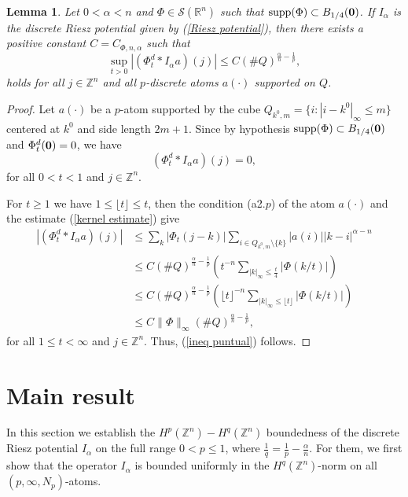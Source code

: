 \documentclass[leqno,12pt]{article} %
\newcommand\supp{\mathop{\rm supp}}
\theoremstyle{plain} %
\newtheorem{lemma}[theorem]{\indent\sc Lemma}
\theoremstyle{definition} %
\begin{document}
\begin{lemma} \label{phimax}
Let $0 < \alpha < n$ and $\Phi \in \mathcal{S}(\mathbb{R}^n)$ such that $\supp(\Phi) \subset B_{1/4}({\bf 0})$. If $I_{\alpha}$ is the discrete Riesz potential given by (\ref{Riesz potential}), then there exists a positive constant $C = C_{\Phi, n, \alpha}$ such that
\begin{equation} \label{ineq puntual}
\sup_{t>0} |(\Phi_t^d \ast I_{\alpha}a)(j)| \leq C (\# Q)^{\frac{\alpha}{n} - \frac{1}{p}},
\end{equation}
holds for all $j \in \mathbb{Z}^n$ and all $p$-discrete atoms $a(\cdot)$ supported on $Q$.
\end{lemma}

\begin{proof}
Let $a(\cdot)$ be a $p$-atom supported by the cube $Q_{k^0, m} = \{ i : | i - k^0 |_{\infty} \leq m \}$ centered at $k^0$ and 
side length $2m+1$. Since by hypothesis $\supp(\Phi) \subset B_{1/4}({\bf 0})$ and $\Phi^{d}_{t}({\bf 0}) = 0$, we have
\[
(\Phi_t^d \ast I_{\alpha}a)(j) = 0, 
\]
for all $0 < t < 1$ and $j \in \mathbb{Z}^n$.

For $t \geq 1$ we have $1 \leq \lfloor t \rfloor \leq t$, then the condition (a2.$p$) of the atom $a(\cdot)$ and the estimate 
(\ref{kernel estimate}) give
\begin{align*}
|(\Phi_t^d \ast I_{\alpha}a)(j)| &\leq \sum_{k} |\Phi_{t}(j-k)| \sum_{i \in Q_{k^0, m} \setminus \{ k \}} |a(i)| |k-i|^{\alpha - n} \\
&\leq C (\# Q)^{\frac{\alpha}{n} - \frac{1}{p}} \left( t^{-n} \sum_{|k|_{\infty} \leq \frac{t}{4}} |\Phi(k/t)| \right) \\
&\leq C (\# Q)^{\frac{\alpha}{n} - \frac{1}{p}} \left( \lfloor t \rfloor^{-n} \sum_{|k|_{\infty} \leq \lfloor t \rfloor} 
|\Phi(k/t)| \right) \\
&\leq C \|\Phi \|_{\infty} (\# Q)^{\frac{\alpha}{n} - \frac{1}{p}},
\end{align*}
for all $1 \leq t < \infty$ and $j \in \mathbb{Z}^n$. Thus, (\ref{ineq puntual}) follows.
\end{proof}

\section{Main result}

In this section we establish the $H^p(\mathbb{Z}^n) - H^q(\mathbb{Z}^n)$ boundedness of the discrete Riesz potential $I_{\alpha}$ on the full range $0 < p \leq 1$, where $\frac{1}{q} = \frac{1}{p} - \frac{\alpha}{n}$. For them, we first show that the operator $I_{\alpha}$ is bounded uniformly in the $H^q(\mathbb{Z}^n)$-norm on all $(p, \infty, N_p)$-atoms.
\end{document}
